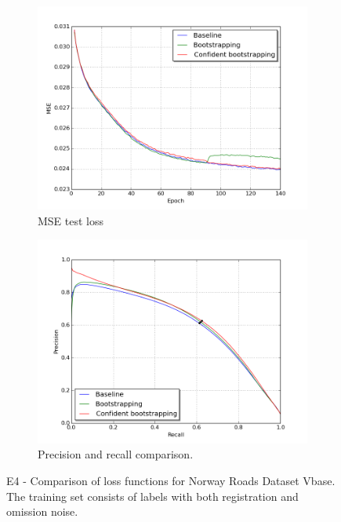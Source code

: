 \begin{figure}[!ht]
\begin{subfigure}{0.48\textwidth}
\includegraphics[width=\linewidth]{figs/E4/E4_lc.png}
\caption{MSE test loss} \label{fig:E4_boot_norway_vbase_loss}
\end{subfigure}
\hspace*{\fill} %
\begin{subfigure}{0.48\textwidth}
\includegraphics[width=\linewidth]{figs/E4/E4_pr.png}
\caption{Precision and recall comparison.} \label{fig:E4_boot_norway_vbase_pr}
\end{subfigure}
\hspace*{\fill} %
\caption{E4 - Comparison of loss functions for Norway Roads Dataset Vbase. The training set consists of labels with both registration and omission noise.} \label{fig:E4_boot_norway_vbase}
\end{figure}

